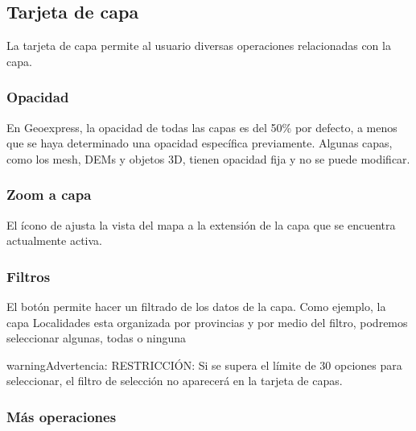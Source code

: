 \documentclass[a4paper,11pt,spanish]{sphinxmanual}
\begin{document}
\subsection{Tarjeta de capa}
\label{\detokenize{navigation/cards:tarjeta-de-capa}}\label{\detokenize{navigation/cards::doc}}
\sphinxAtStartPar
La tarjeta de capa permite al usuario diversas operaciones relacionadas con la capa.


\subsubsection{Opacidad}
\label{\detokenize{navigation/cards:opacidad}}
\noindent{}

\sphinxAtStartPar
En Geoexpress, la opacidad de todas las capas es del 50\% por defecto, a menos que se haya determinado una opacidad específica previamente. Algunas capas, como los mesh, DEMs y objetos 3D, tienen opacidad fija y no se puede modificar.


\subsubsection{Zoom a capa}
\label{\detokenize{navigation/cards:zoom-a-capa}}
\noindent{}

\sphinxAtStartPar
El ícono de  ajusta la vista del mapa a la extensión de la capa que se encuentra actualmente activa.


\subsubsection{Filtros}
\label{\detokenize{navigation/cards:filtros}}
\noindent{}

\sphinxAtStartPar
El botón  permite hacer un filtrado de los datos de la capa. Como ejemplo, la capa Localidades esta organizada por provincias y por medio del filtro, podremos seleccionar algunas, todas o ninguna

\begin{sphinxadmonition}{warning}{Advertencia:}
\sphinxAtStartPar
RESTRICCIÓN: Si se supera el límite de 30 opciones para seleccionar, el filtro de selección no aparecerá en la tarjeta de capas.
\end{sphinxadmonition}


\subsubsection{Más operaciones}
\label{\detokenize{navigation/cards:mas-operaciones}}
\noindent{}
\end{document}
